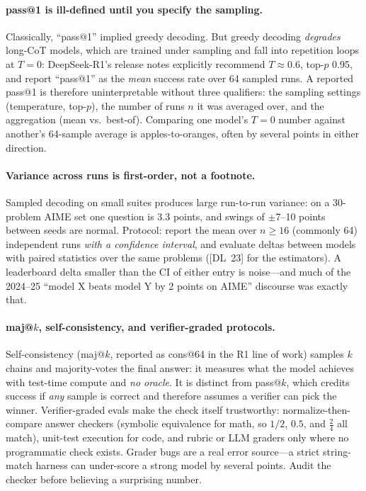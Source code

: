 \paragraph{pass@1 is ill-defined until you specify the sampling.}
Classically, ``pass@1'' implied greedy decoding.  But greedy decoding
\emph{degrades} long-CoT models, which are trained under sampling and fall
into repetition loops at $T=0$: DeepSeek-R1's release notes explicitly
recommend $T \approx 0.6$, top-$p$ 0.95, and report ``pass@1'' as the
\emph{mean} success rate over 64 sampled runs.  A reported pass@1 is
therefore uninterpretable without three qualifiers: the sampling settings
(temperature, top-$p$), the number of runs $n$ it was averaged over, and the
aggregation (mean vs.\ best-of).  Comparing one model's $T{=}0$ number
against another's 64-sample average is apples-to-oranges, often by several
points in either direction.

\paragraph{Variance across runs is first-order, not a footnote.}
Sampled decoding on small suites produces large run-to-run variance: on a
30-problem AIME set one question is 3.3 points, and swings of $\pm$7--10
points between seeds are normal.  Protocol: report the mean over $n \geq 16$
(commonly 64) independent runs \emph{with a confidence interval}, and
evaluate deltas between models with paired statistics over the same problems
([DL~23] for the estimators).  A leaderboard delta smaller than the CI of
either entry is noise---and much of the 2024--25 ``model X beats model Y by
2 points on AIME'' discourse was exactly that.

\paragraph{maj@$k$, self-consistency, and verifier-graded protocols.}
Self-consistency (maj@$k$, reported as cons@64 in the R1 line of work)
samples $k$ chains and majority-votes the final answer: it measures what the
model achieves with test-time compute and \emph{no oracle}.  It is distinct
from pass@$k$, which credits success if \emph{any} sample is correct and
therefore assumes a verifier can pick the winner.  Verifier-graded evals make
the check itself trustworthy: normalize-then-compare answer checkers
(symbolic equivalence for math, so $1/2$, $0.5$, and $\frac{2}{4}$ all
match), unit-test execution for code, and rubric or LLM graders only where no
programmatic check exists.  Grader bugs are a real error source---a strict
string-match harness can under-score a strong model by several points.
Audit the checker before believing a surprising number.


